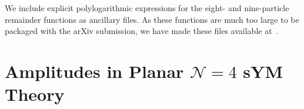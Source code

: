 \documentclass[11pt]{article}
\begin{document}
We include explicit polylogarithmic expressions for the eight- and nine-particle remainder functions as ancillary files. As these functions are much too large to be packaged with the arXiv submission, we have made these files available at~\cite{anc_files}.


\section{Amplitudes in Planar $\mathcal{N}=4$ sYM Theory}
\label{sec:amplitudes_review}
\end{document}
